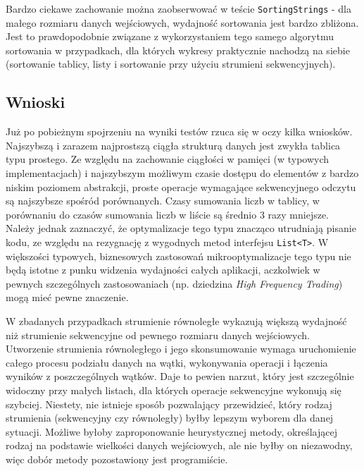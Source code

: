 \documentclass[12pt,twoside,openright]{extarticle}
\begin{document}
    Bardzo ciekawe zachowanie można zaobserwować w teście \texttt{SortingStrings} - dla małego rozmiaru danych wejściowych, wydajność sortowania jest bardzo zbliżona. Jest to prawdopodobnie związane z wykorzystaniem tego samego algorytmu sortowania w przypadkach, dla których wykresy praktycznie nachodzą na siebie (sortowanie tablicy, listy i sortowanie przy użyciu strumieni sekwencyjnych).

\newpage

\subsection{Wnioski}

    Już po pobieżnym spojrzeniu na wyniki testów rzuca się w oczy kilka wniosków. Najszybszą i zarazem najprostszą ciągła strukturą danych jest zwykła tablica typu prostego. Ze względu na zachowanie ciągłości w pamięci (w typowych implementacjach) i najszybszym możliwym czasie dostępu do elementów z bardzo niskim poziomem abstrakcji, proste operacje wymagające sekwencyjnego odczytu są najszybsze spośród porównanych. Czasy sumowania liczb w tablicy, w porównaniu do czasów sumowania liczb w liście są średnio 3 razy mniejsze. Należy jednak zaznaczyć, że optymalizacje tego typu znacząco utrudniają pisanie kodu, ze względu na rezygnację z wygodnych metod interfejsu \texttt{List<T>}. W większości typowych, biznesowych zastosowań mikrooptymalizacje tego typu nie będą istotne z punku widzenia wydajności całych aplikacji, aczkolwiek w pewnych szczególnych zastosowaniach (np. dziedzina \textit{High Frequency Trading}) mogą mieć pewne znaczenie.

    W zbadanych przypadkach strumienie równoległe wykazują większą wydajność niż strumienie sekwencyjne od pewnego rozmiaru danych wejściowych. Utworzenie strumienia równoległego i jego skonsumowanie wymaga uruchomienie całego procesu podziału danych na wątki, wykonywania operacji i łączenia wyników z poszczególnych wątków. Daje to pewien narzut, który jest szczególnie widoczny przy małych listach, dla których operacje sekwencyjne wykonują się szybciej. Niestety, nie istnieje sposób pozwalający przewidzieć, który rodzaj strumienia (sekwencyjny czy równoległy) byłby lepszym wyborem dla danej sytuacji. Możliwe byłoby zaproponowanie heurystycznej metody, określającej rodzaj na podstawie wielkości danych wejściowych, ale nie byłby on niezawodny, więc dobór metody pozostawiony jest programiście.
\end{document}
